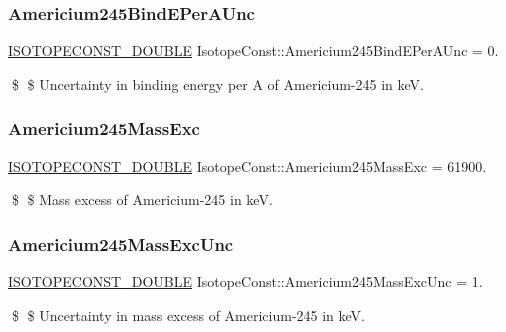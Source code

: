 \subsubsection{\texorpdfstring{Americium245\+Bind\+E\+Per\+A\+Unc}{Americium245BindEPerAUnc}}
{\footnotesize\ttfamily \mbox{\hyperlink{group___isotope_const-_macros_ga8f45a7272ce02c0b4c65c44636ed719a}{I\+S\+O\+T\+O\+P\+E\+C\+O\+N\+S\+T\+\_\+\+D\+O\+U\+B\+LE}} Isotope\+Const\+::\+Americium245\+Bind\+E\+Per\+A\+Unc = 0.}

\$ \$ Uncertainty in binding energy per A of Americium-\/245 in keV. \mbox{\label{group___isotope_const-_americium-_am245_gad9284eb34cbd6e4b794eda5400cb44e3}} 
\subsubsection{\texorpdfstring{Americium245\+Mass\+Exc}{Americium245MassExc}}
{\footnotesize\ttfamily \mbox{\hyperlink{group___isotope_const-_macros_ga8f45a7272ce02c0b4c65c44636ed719a}{I\+S\+O\+T\+O\+P\+E\+C\+O\+N\+S\+T\+\_\+\+D\+O\+U\+B\+LE}} Isotope\+Const\+::\+Americium245\+Mass\+Exc = 61900.}

\$ \$ Mass excess of Americium-\/245 in keV. \mbox{\label{group___isotope_const-_americium-_am245_ga350be8265084bb85c4e6ef2e965030a3}} 
\subsubsection{\texorpdfstring{Americium245\+Mass\+Exc\+Unc}{Americium245MassExcUnc}}
{\footnotesize\ttfamily \mbox{\hyperlink{group___isotope_const-_macros_ga8f45a7272ce02c0b4c65c44636ed719a}{I\+S\+O\+T\+O\+P\+E\+C\+O\+N\+S\+T\+\_\+\+D\+O\+U\+B\+LE}} Isotope\+Const\+::\+Americium245\+Mass\+Exc\+Unc = 1.}

\$ \$ Uncertainty in mass excess of Americium-\/245 in keV. \mbox{\label{group___isotope_const-_americium-_am245_gadff6911488606d24f4e8d14b69557804}} 
